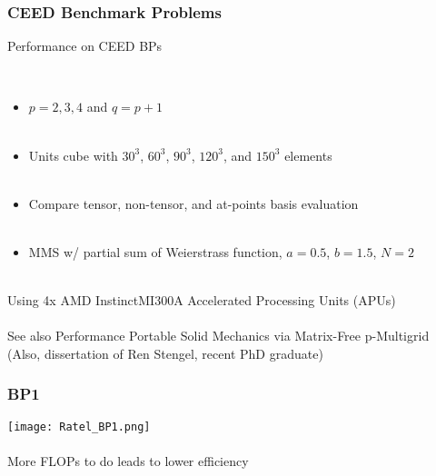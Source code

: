 \documentclass{beamer}
\begin{document}
\begin{frame}
\begin{center}
\frametitle{CEED Benchmark Problems}

Performance on CEED BPs

~\\

\begin{itemize}

\item $p = 2, 3, 4$ and $q = p + 1$\\

~\\

\item Units cube with $30^3$, $60^3$, $90^3$, $120^3$, and $150^3$ elements\\

~\\

\item Compare tensor, non-tensor, and at-points basis evaluation\\

~\\

\item MMS w/ partial sum of Weierstrass function, $a = 0.5$, $b = 1.5$, $N = 2$\\

\end{itemize}

~\\

Using 4x AMD Instinct\texttrademark MI300A Accelerated Processing Units (APUs)\\

~\\

See also Performance Portable Solid Mechanics via Matrix-Free p-Multigrid\\

(Also, dissertation of Ren Stengel, recent PhD graduate)

\end{center}
\end{frame}


\begin{frame}
\begin{center}
\frametitle{BP1}

\texttt{[image: Ratel\_BP1.png]}\\

~\\

More FLOPs to do leads to lower efficiency

\end{center}
\end{frame}
\end{document}
